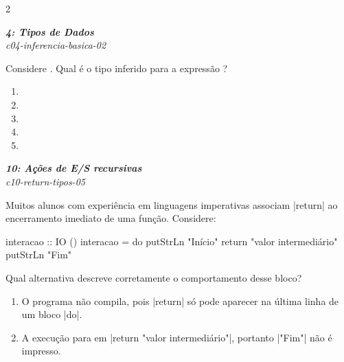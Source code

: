 \documentclass[a4paper,10pt,brazil]{article}
\begin{document}
\begin{multicols}{2}
\begin{enumerate}
\end{enumerate}

\begin{flushright}
  \footnotesize
  \textit{\textbf{4: Tipos de Dados}}\\
  \textit{c04-inferencia-basica-02}\\

\end{flushright}
Considere . Qual é o tipo inferido para a expressão ?

\begin{enumerate}
  \item {}

  \item {}

  \item {}

  \item {}

  \item {}


\end{enumerate}

\begin{flushright}
  \footnotesize
  \textit{\textbf{10: Ações de E/S recursivas}}\\
  \textit{c10-return-tipos-05}\\

\end{flushright}
Muitos alunos com experiência em linguagens imperativas associam \haskellinline|return| ao encerramento imediato de uma função. Considere:

\begin{haskellcode}
interacao :: IO ()
interacao = do
  putStrLn "Início"
  return "valor intermediário"
  putStrLn "Fim"
\end{haskellcode}

Qual alternativa descreve corretamente o comportamento desse bloco?

\begin{enumerate}
  \item O programa não compila, pois \haskellinline|return| só pode aparecer na última linha de um bloco \haskellinline|do|.

  \item A execução para em \haskellinline|return "valor intermediário"|, portanto \haskellinline|"Fim"| não é impresso.


\end{enumerate}
\end{multicols}
\end{document}
